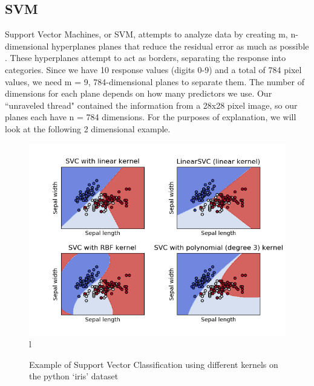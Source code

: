 \documentclass[11pt, oneside]{article}   	%
\begin{document}
\subsection{SVM}
Support Vector Machines, or SVM, attempts to analyze data by creating m, n-dimensional hyperplanes planes that reduce the residual error as much as possible \cite{SVMBook}. These hyperplanes attempt to act as borders, separating the response into categories. Since we have 10 response values (digits 0-9) and a total of 784 pixel values, we need m = 9, 784-dimensional planes to separate them. The number of dimensions for each plane depends on how many predictors we use. Our ``unraveled thread" contained the information from a 28x28 pixel image, so our planes each have n = 784 dimensions. For the purposes of explanation, we will look at the following 2 dimensional example.
\begin{figure}
\caption{Example of Support Vector Classification using different kernels on the python `iris' dataset}
\includegraphics[width=\textwidth]{Figure_1.png}l
\end{figure}
\end{document}
